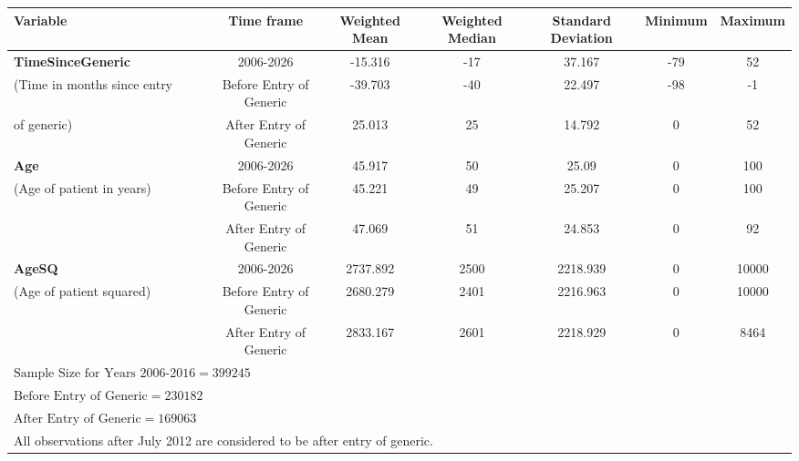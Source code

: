 \begin{tabular}{l*{6}{c}}
\hline\hline
            Variable&\multicolumn{1}{c}{Time frame}&\multicolumn{1}{c}{Weighted Mean}&\multicolumn{1}{c}{Weighted Median}&\multicolumn{1}{c}{Standard Deviation}&\multicolumn{1}{c}{Minimum}&\multicolumn{1}{c}{Maximum}\\
\hline
\textbf{TimeSinceGeneric}                    &     2006-2026&             -15.316&    -17&   37.167&     -79&  52\\
(Time in months since entry &     Before Entry of Generic&     -39.703&    -40&    22.497 &     -98&  -1\\
 of generic)   &     After Entry of Generic&       25.013 &    25&      14.792&     0&  52\\
[1em]
\textbf{Age}                                 &     2006-2026&             45.917&    50&    25.09 &     0&  100\\
(Age of patient in years)           &     Before Entry of Generic&     45.221&    49&    25.207&     0&  100\\
                                    &     After Entry of Generic&      47.069&    51&    24.853&     0&  92\\
[1em]
\textbf{AgeSQ}                               &     2006-2026&             2737.892&    2500&  2218.939&     0&  10000\\
(Age of patient squared)   &     Before Entry of Generic&    2680.279&    2401&  2216.963 &     0&  10000\\
                                    &     After Entry of Generic&      2833.167&    2601&  2218.929 &     0&  8464\\
\hline
$\text{Sample Size for Years 2006-2016} = 399245$\\
$\text{Before Entry of Generic} = 230182$\\
$\text{After Entry of Generic} = 169063$\\
\hline\hline
\multicolumn{4}{l}{\footnotesize All observations after July 2012 are considered to be after entry of generic.}\\
\end{tabular}
